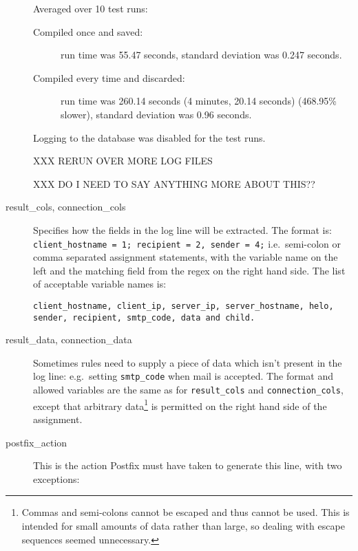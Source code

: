\documentclass[a4paper,12pt,draft]{article}
\begin{document}
\begin{description}
        Averaged over 10 test runs:

        \begin{description} 

            \item [Compiled once and saved:] run time was 55.47 seconds,
                standard deviation was 0.247 seconds.

            \item [Compiled every time and discarded:] run time was 260.14
                seconds (4 minutes, 20.14 seconds) (468.95\% slower),
                standard deviation was 0.96 seconds.

        \end{description}

        Logging to the database was disabled for the test runs.

        XXX RERUN OVER MORE LOG FILES

        XXX DO I NEED TO SAY ANYTHING MORE ABOUT THIS??

    \item [result\_cols, connection\_cols] Specifies how the fields in the
        log line will be extracted.  The format is: \newline
        \texttt{client\_hostname = 1; recipient = 2, sender = 4;} \newline
        i.e.\ semi-colon or comma separated assignment statements, with the
        variable name on the left and the matching field from the regex on
        the right hand side.  The list of acceptable variable names is:

        \texttt{client\_hostname, client\_ip, server\_ip, server\_hostname,
        \newline helo, sender, recipient, smtp\_code, data and child.}

    \item [result\_data, connection\_data] Sometimes rules need to supply a
        piece of data which isn't present in the log line: e.g.\ setting
        \texttt{smtp\_code} when mail is accepted.  The format and allowed
        variables are the same as for \texttt{result\_cols} and
        \texttt{connection\_cols}, except that arbitrary
        data\footnote{Commas and semi-colons cannot be escaped and thus
        cannot be used.  This is intended for small amounts of data rather
        than large, so dealing with escape sequences seemed unnecessary.}
        is permitted on the right hand side of the assignment.

    \item [postfix\_action] This is the action Postfix must have taken to
        generate this line, with two exceptions:


\end{description}
\end{document}

